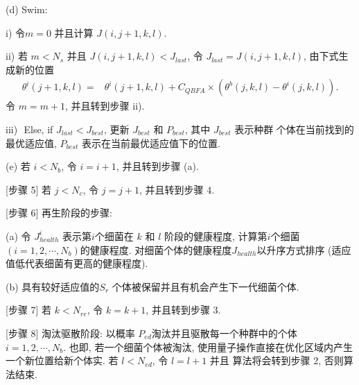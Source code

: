 \quad\quad (d) Swim:

\quad\quad \quad i) 令$m=0$ 并且计算 $J(i,j+1,k,l)$.

\quad\quad \quad ii) 若 $m<N_s$ 并且 $J(i, j+1, k, l)<J_{last}$, 令 $J_{last}=J(i, j+1, k, l)$, 由下式生成新的位置
\begin{align}
  \theta^i(j+1,k,l)=&\theta^i(j+1,k,l)+C_{QBFA}
  \times(\theta^b(j,k,l)-\theta^i(j,k,l)).
\end{align}
令 $m=m+1$, 并且转到步骤 ii).

\quad\quad \quad iii)\,\, \textcolor[rgb]{0,0,1}{Else, if} $J_{last}<J_{best}$, 更新 $J_{best}$ 和 $P_{best}$, 其中 $J_{best}$ 表示种群 个体在当前找到的最优适应值, $P_{best}$ 表示在当前最优适应值下的位置.

\quad\quad (e) 若 $i<N_b$, 令 $i=i+1$, 并且转到步骤 (a).

[步骤 5] 若 $j<N_c$, 令 $j=j+1$, 并且转到步骤 4.

[步骤 6] 再生阶段的步骤:

\quad\quad (a) 令 $J_{health}^i$ 表示第$i$个细菌在 $k$ 和 $l$ 阶段的健康程度, 计算第$i$个细菌 $(i=1, 2, \cdots, N_b)$的健康程度.
对细菌个体的健康程度$J_{health}$以升序方式排序 (适应值低代表细菌有更高的健康程度).

\quad\quad (b) 具有较好适应值的$S_r$ 个体被保留并且有机会产生下一代细菌个体.

[步骤 7] 若 $k<N_{re}$, 令 $k=k+1$, 并且转到步骤 3.

[步骤 8] 淘汰驱散阶段: 以概率 $P_{ed}$淘汰并且驱散每一个种群中的个体 $i=1,2,\cdots, N_b$. 也即, 若一个细菌个体被淘汰, 使用量子操作直接在优化区域内产生一个新位置给新个体实.
若 $l<N_{ed}$, 令 $l=l+1$ 并且 算法将会转到步骤 2, 否则算法结束.

